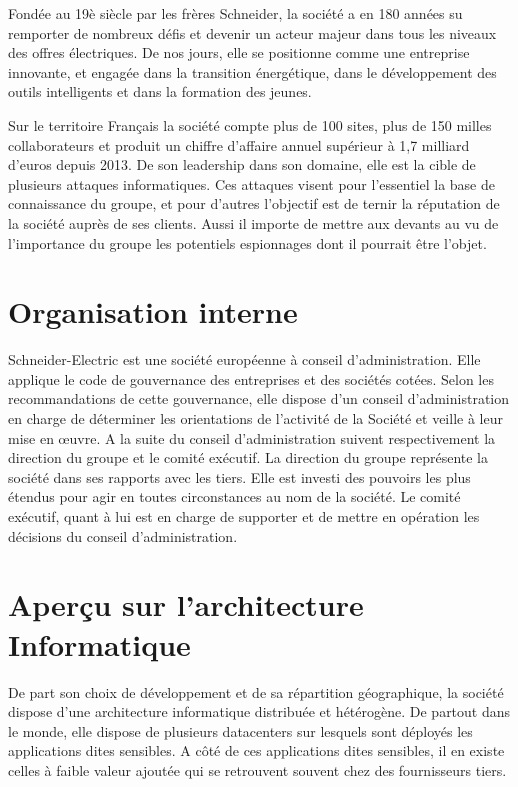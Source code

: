 \documentclass[a4paper,12pt]{book}
\theoremstyle{break}
\begin{document}
Fondée au 19è siècle par les frères Schneider, la société a en 180 années su remporter de nombreux défis et devenir un acteur majeur dans tous les niveaux des offres électriques. De nos jours, elle se positionne comme une entreprise innovante, et engagée dans la transition énergétique, dans le développement des outils intelligents et dans la formation des jeunes.


Sur le territoire Français la société compte plus de 100 sites, plus de 150 milles collaborateurs et produit un chiffre d'affaire annuel supérieur à 1,7 milliard d'euros depuis 2013.\newline
De son leadership dans son domaine, elle est la cible de plusieurs attaques informatiques. Ces attaques visent pour l’essentiel la base de connaissance du groupe, et pour d’autres l'objectif est de ternir la réputation de la société auprès de ses clients.
Aussi il importe de mettre aux devants au vu de l'importance du groupe les potentiels espionnages dont il pourrait être l'objet.


\section{Organisation interne}
Schneider-Electric est une société européenne à conseil d’administration. Elle applique le code de gouvernance des entreprises et des sociétés cotées. 
Selon les recommandations de cette gouvernance, elle dispose d’un conseil d’administration en charge de déterminer les orientations de l’activité de la Société et veille à leur mise en œuvre. 
\newline 
A la suite du conseil d'administration suivent respectivement la direction du groupe et le comité exécutif. La direction du groupe représente la société dans ses rapports avec les tiers. Elle est investi des pouvoirs les plus étendus pour agir en toutes circonstances au nom de la société. 
\newline
Le comité exécutif, quant à lui est en charge de supporter et de mettre en opération les décisions du conseil d'administration. 

\section{Aperçu sur l'architecture Informatique}
De part son choix de développement et de sa répartition géographique, la société dispose d’une architecture informatique distribuée et hétérogène.
De partout dans le monde, elle dispose de plusieurs datacenters sur lesquels sont déployés les applications dites sensibles.
\newline
A côté de ces applications dites sensibles, il en existe celles à faible valeur ajoutée qui se retrouvent souvent chez des fournisseurs tiers.
\end{document}
